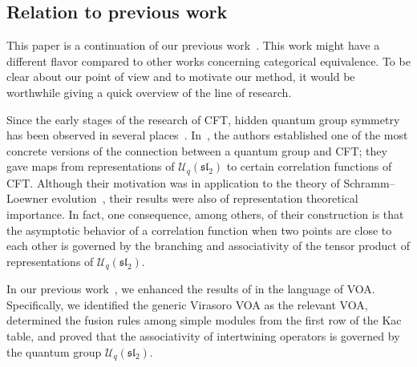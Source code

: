 \documentclass[10pt,a4paper]{amsart}
\numberwithin{equation}{section}
\newcommand{\cU}{\mathcal{U}}
\newcommand{\fsl}{\mathfrak{sl}}
\newcommand{\UEA}{\cU}
\newcommand{\Uq}{\UEA_{q}}
\begin{document}
\subsection{Relation to previous work}
This paper is a continuation of our previous work~\cite{KoshidaKytola2022}.
This work might have a different flavor compared to other works concerning categorical equivalence.
To be clear about our point of view and to motivate our method,
it would be worthwhile giving a quick overview of the line of research.

Since the early stages of the research of CFT, hidden quantum group symmetry has been observed in several places~\cite{FW-topological_representation_of_Uqsl2,GRS-quantum_groups_in_2d_physics,MR-comment_on_quantum_group_symmetry_in_CFT,PS-common_structures_between_finite_systems_and_CFTs,RRR-contour_picture_of_quantum_groups_in_CFT, SV-quantum_groups_and_homology_of_local_systems,
Varchenko-multidimensional_hypergeometric_functions_and_representation_theory_of_Lie_algebras_and_quantum_groups}.
In~\cite{KP-conformally_covariant_bdry_correlations}, the authors established one of the most concrete versions of the connection between a quantum group and CFT;
they gave maps from representations of $\Uq(\fsl_{2})$ to certain correlation functions of CFT.
Although their motivation was in application to the theory of Schramm--Loewner evolution~\cite{BB-CFTs_of_SLEs,Schramm2000}, their results were also of representation theoretical importance.
In fact, one consequence, among others, of their construction is that the asymptotic behavior of a correlation function when two points are close to each other is governed by the branching and associativity of the tensor product of representations of $\Uq(\fsl_{2})$.

In our previous work~\cite{KoshidaKytola2022}, we enhanced the results of \cite{KP-conformally_covariant_bdry_correlations} in the language of VOA.
Specifically, we identified the generic Virasoro VOA as the relevant VOA, determined the fusion rules among simple modules from the first row of the Kac table, and proved that the associativity of intertwining operators is governed by the quantum group $\Uq(\fsl_{2})$.
\end{document}

